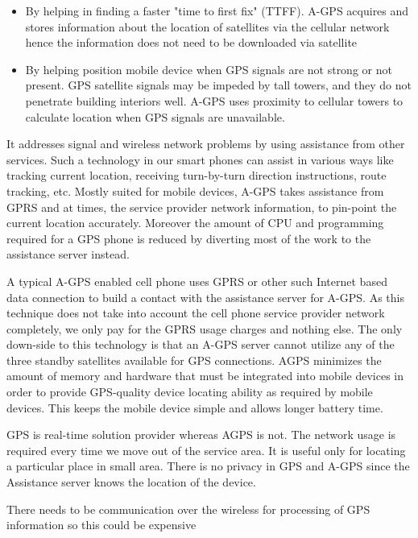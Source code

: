 \documentclass[12pt]{report}
\begin{document}
	\begin{itemize}
	\item By helping in finding a faster "time to first fix" 
	(TTFF). A-GPS acquires and stores information about 
	the location of satellites via the cellular network hence 
	the information does not need to be downloaded via 
	satellite
	\item By helping position mobile device when GPS signals 
	are not strong or not present. GPS satellite signals may 
	be impeded by tall towers, and they do not penetrate 
	building interiors well. A-GPS uses proximity to 
	cellular towers to calculate location when GPS signals 
	are unavailable. 
	\end{itemize}
	
	It addresses signal and wireless network problems by using 
	assistance from other services. Such a technology in our 
	smart phones can assist in various ways like tracking 
	current location, receiving turn-by-turn direction 
	instructions, route tracking, etc. Mostly suited for mobile devices, A-GPS takes assistance 
	from GPRS and at times, the service provider network 
	information, to pin-point the current location accurately. 
	Moreover the amount of CPU and programming required 
	for a GPS phone is reduced by diverting most of the work 
	to the assistance server instead. 
	
	A typical A-GPS enabled cell phone uses GPRS or other 
	such Internet based data connection to build a contact with 
	the assistance server for A-GPS. As this technique does 
	not take into account the cell phone service provider 
	network completely, we only pay for the GPRS usage 
	charges and nothing else. The only down-side to this 
	technology is that an A-GPS server cannot utilize any of 
	the three standby satellites available for GPS connections. 
	AGPS minimizes the amount of memory and hardware 
	that must be integrated into mobile devices in order to 
	provide GPS-quality device locating ability as required by 
	mobile devices. This keeps the mobile device simple and 
	allows longer battery time.
	
	GPS is real-time solution provider whereas AGPS is not. 
	The network usage is required every time we move out of 
	the service area. It is useful only for locating a particular 
	place in small area. There is no privacy in GPS and A-GPS 
	since the Assistance server knows the location of the 
	device. 
	
	There needs to be communication over the wireless for 
	processing of GPS information so this could be expensive
	
\end{document}
